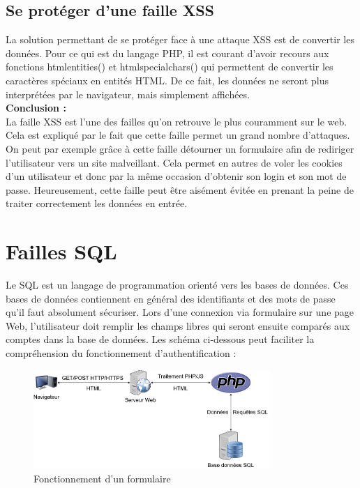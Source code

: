 \subsection{Se protéger d'une faille XSS}

La solution permettant de se protéger face à une attaque XSS est de convertir les données. Pour ce qui est du langage PHP, il est courant d’avoir recours aux fonctions htmlentities() et htmlspecialchars() qui permettent de convertir les caractères spéciaux en entités HTML. De ce fait, les données ne seront plus interprétées par le navigateur, mais simplement affichées.\\

 \textbf{Conclusion : }\\

La faille XSS est l’une des failles qu’on retrouve le plus couramment sur le web. Cela est expliqué par le fait que cette faille permet un grand nombre d’attaques. On peut par exemple grâce à cette faille détourner un formulaire afin de rediriger l’utilisateur vers un site malveillant. Cela permet en autres de voler les cookies d’un utilisateur et donc par la même occasion d’obtenir son login et son mot de passe.
Heureusement, cette faille peut être aisément évitée en prenant la peine de traiter correctement les données en entrée.



\section{Failles SQL}

Le SQL est un langage de programmation orienté vers les bases de données. Ces bases de données contiennent en général des identifiants et des mots de passe qu'il faut absolument sécuriser. Lors d'une connexion via formulaire sur une page Web, l'utilisateur doit remplir les champs libres qui seront ensuite comparés aux comptes dans la base de données. Les schéma ci-dessous peut faciliter la compréhension du fonctionnement d'authentification :

\begin{figure}[htp!]
  \centering
  \setlength\figureheight{7cm}
  \setlength\figurewidth{9cm}
  \includegraphics[width=0.8\textwidth]{oui/Ancien/imangeancien/SQLi/SQLDiagram.png}
  \caption{Fonctionnement d'un formulaire}
  \label{fig:courbe-tikz}
\end{figure}

